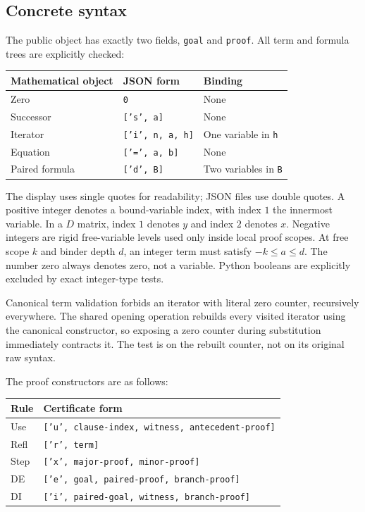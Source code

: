 \documentclass[11pt,letterpaper]{article}
\theoremstyle{definition}
\begin{document}
\subsection{Concrete syntax}

The public object has exactly two fields, \texttt{goal} and
\texttt{proof}. All term and formula trees are explicitly checked:
\begin{center}
\begin{tabular}{lll}
\toprule
Mathematical object & JSON form & Binding\\
\midrule
Zero & \texttt{0} & None\\
Successor & \texttt{['s', a]} & None\\
Iterator & \texttt{['i', n, a, h]} & One variable in \texttt{h}\\
Equation & \texttt{['=', a, b]} & None\\
Paired formula & \texttt{['d', B]} & Two variables in \texttt{B}\\
\bottomrule
\end{tabular}
\end{center}
The display uses single quotes for readability; JSON files use double
quotes. A positive integer denotes a bound-variable index, with
index \(1\) the innermost variable. In a \(D\) matrix, index \(1\)
denotes \(y\) and index \(2\) denotes \(x\). Negative integers are
rigid free-variable levels used only inside local proof scopes.
At free scope \(k\) and binder depth \(d\), an integer term must satisfy
\(-k\leq a\leq d\). The number zero always denotes zero, not a variable.
Python booleans are explicitly excluded by exact integer-type tests.

Canonical term validation forbids an iterator with literal zero
counter, recursively everywhere. The shared opening operation rebuilds
every visited iterator using the canonical constructor, so exposing a
zero counter during substitution immediately contracts it. The test is
on the rebuilt counter, not on its original raw syntax.

The proof constructors are as follows:
\begin{center}
\begin{tabular}{ll}
\toprule
Rule & Certificate form\\
\midrule
Use & \texttt{['u', clause-index, witness, antecedent-proof]}\\
Refl & \texttt{['r', term]}\\
Step & \texttt{['x', major-proof, minor-proof]}\\
DE & \texttt{['e', goal, paired-proof, branch-proof]}\\
DI & \texttt{['i', paired-goal, witness, branch-proof]}\\
\bottomrule
\end{tabular}
\end{center}
\end{document}
